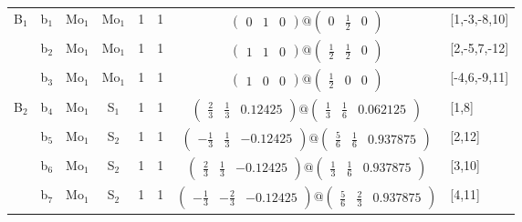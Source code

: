 \documentclass[fleqn,10pt,landscape]{article}
\begin{document}
\begin{itemize}
\begin{center}
\begin{longtable}{cc|cc|c|c|c|l}
B$_{1}$ & b$_{1}$ & Mo$_{1}$ & Mo$_{1}$ & 1 & 1 & $\begin{pmatrix} 0 & 1 & 0 \end{pmatrix}@\begin{pmatrix} 0 & \frac{1}{2} & 0 \end{pmatrix}$ & [1,-3,-8,10] \\
& b$_{2}$ & Mo$_{1}$ & Mo$_{1}$ & 1 & 1 & $\begin{pmatrix} 1 & 1 & 0 \end{pmatrix}@\begin{pmatrix} \frac{1}{2} & \frac{1}{2} & 0 \end{pmatrix}$ & [2,-5,7,-12] \\
& b$_{3}$ & Mo$_{1}$ & Mo$_{1}$ & 1 & 1 & $\begin{pmatrix} 1 & 0 & 0 \end{pmatrix}@\begin{pmatrix} \frac{1}{2} & 0 & 0 \end{pmatrix}$ & [-4,6,-9,11] \\ \hline
B$_{2}$ & b$_{4}$ & Mo$_{1}$ & S$_{1}$ & 1 & 1 & $\begin{pmatrix} \frac{2}{3} & \frac{1}{3} & 0.12425 \end{pmatrix}@\begin{pmatrix} \frac{1}{3} & \frac{1}{6} & 0.062125 \end{pmatrix}$ & [1,8] \\
& b$_{5}$ & Mo$_{1}$ & S$_{2}$ & 1 & 1 & $\begin{pmatrix} - \frac{1}{3} & \frac{1}{3} & -0.12425 \end{pmatrix}@\begin{pmatrix} \frac{5}{6} & \frac{1}{6} & 0.937875 \end{pmatrix}$ & [2,12] \\
& b$_{6}$ & Mo$_{1}$ & S$_{2}$ & 1 & 1 & $\begin{pmatrix} \frac{2}{3} & \frac{1}{3} & -0.12425 \end{pmatrix}@\begin{pmatrix} \frac{1}{3} & \frac{1}{6} & 0.937875 \end{pmatrix}$ & [3,10] \\
& b$_{7}$ & Mo$_{1}$ & S$_{2}$ & 1 & 1 & $\begin{pmatrix} - \frac{1}{3} & - \frac{2}{3} & -0.12425 \end{pmatrix}@\begin{pmatrix} \frac{5}{6} & \frac{2}{3} & 0.937875 \end{pmatrix}$ & [4,11] \\

\end{longtable}
\end{center}
\end{itemize}
\end{document}
